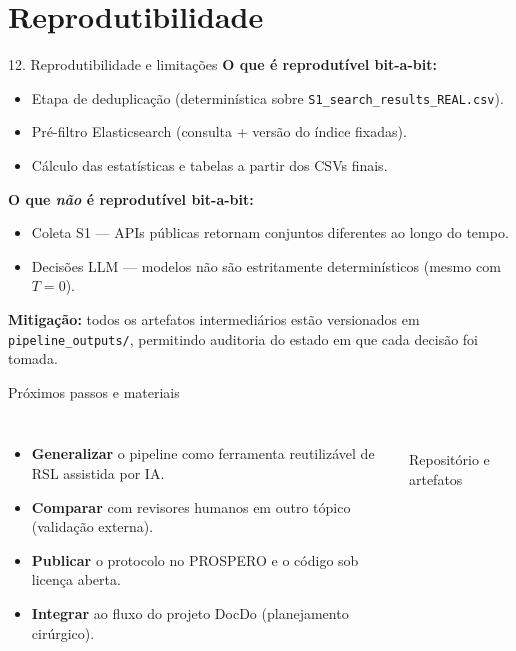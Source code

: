 \documentclass[aspectratio=169]{beamer}
\begin{document}
\section{Reprodutibilidade}
\begin{frame}{12. Reprodutibilidade e limitações}
\small
\textbf{O que é reprodutível bit-a-bit:}
\begin{itemize}
	\item Etapa de deduplicação (determinística sobre \texttt{S1\_search\_results\_REAL.csv}).
	\item Pré-filtro Elasticsearch (consulta + versão do índice fixadas).
	\item Cálculo das estatísticas e tabelas a partir dos CSVs finais.
\end{itemize}

\textbf{O que \emph{não} é reprodutível bit-a-bit:}
\begin{itemize}
	\item Coleta S1 --- APIs públicas retornam conjuntos diferentes ao longo do tempo.
	\item Decisões LLM --- modelos não são estritamente determinísticos (mesmo com $T=0$).
\end{itemize}

\textbf{Mitigação:} todos os artefatos intermediários estão versionados em \texttt{pipeline\_outputs/}, permitindo auditoria do estado em que cada decisão foi tomada.
\end{frame}

\begin{frame}{Próximos passos e materiais}
\small
\begin{columns}[c]
\begin{itemize}
  \item \textbf{Generalizar} o pipeline como ferramenta reutilizável de RSL assistida por IA.
  \item \textbf{Comparar} com revisores humanos em outro tópico (validação externa).
  \item \textbf{Publicar} o protocolo no PROSPERO e o código sob licença aberta.
  \item \textbf{Integrar} ao fluxo do projeto DocDo (planejamento cirúrgico).
\end{itemize}
\centering
{}\\
\scriptsize Repositório e artefatos
\end{columns}
\end{frame}
\end{document}
